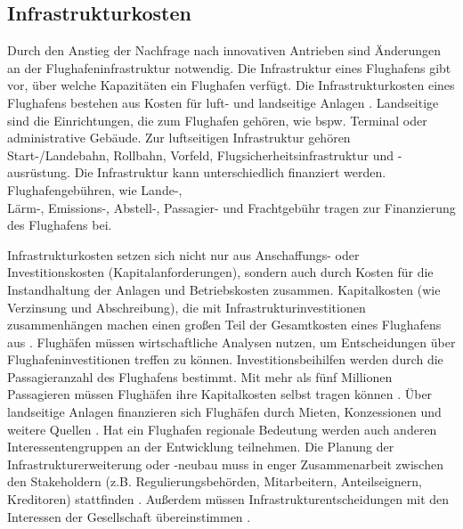 \subsection{Infrastrukturkosten}
%
Durch den Anstieg der Nachfrage nach innovativen Antrieben sind Änderungen an der Flughafeninfrastruktur notwendig.
%
Die Infrastruktur eines Flughafens gibt vor, über welche Kapazitäten ein Flughafen verfügt.
Die Infrastrukturkosten eines Flughafens bestehen aus Kosten für luft- und landseitige Anlagen \cite{fur2003infrastrukturkosten}. 
Landseitige sind die Einrichtungen, die zum Flughafen gehören, wie bspw. Terminal oder administrative Gebäude. 
Zur luftseitigen Infrastruktur gehören Start-/Landebahn, Rollbahn, Vorfeld, Flugsicherheitsinfrastruktur und -ausrüstung. 
Die Infrastruktur kann unterschiedlich finanziert werden.
Flughafengebühren, wie Lande-, \\Lärm-, Emissions-, Abstell-, Passagier- und Frachtgebühr 
tragen zur Finanzierung des Flughafens bei.

Infrastrukturkosten setzen sich nicht nur aus Anschaffungs- oder Investitionskosten (Kapitalanforderungen), 
sondern auch durch Kosten für die Instandhaltung der Anlagen und Betriebskosten zusammen.
Kapitalkosten (wie Verzinsung und Abschreibung), die mit Infrastrukturinvestitionen zusammenhängen 
machen einen großen Teil der Gesamtkosten eines Flughafens aus \cite{wittmer2011aviation}.
%
Flughäfen müssen wirtschaftliche Analysen nutzen, um Entscheidungen über Flughafeninvestitionen treffen zu können. %
Investitionsbeihilfen werden durch die Passagieranzahl des Flughafens bestimmt. 
Mit mehr als fünf Millionen Passagieren müssen Flughäfen ihre Kapitalkosten selbst tragen können \cite{conrady2019luftverkehr}. 
%
Über landseitige Anlagen finanzieren sich Flughäfen durch Mieten, Konzessionen und weitere Quellen \cite{fur2003infrastrukturkosten}.
Hat ein Flughafen regionale Bedeutung werden auch anderen Interessentengruppen an der Entwicklung teilnehmen.
Die Planung der Infrastrukturerweiterung oder -neubau muss in enger Zusammenarbeit 
zwischen den Stakeholdern (z.B. Regulierungsbehörden, Mitarbeitern, Anteilseignern, Kreditoren) stattfinden \cite{wittmer2011aviation}.
%
Außerdem müssen Infrastrukturentscheidungen mit den Interessen der Gesellschaft übereinstimmen \cite{WissenschaftlicherBeirat2011}. 

